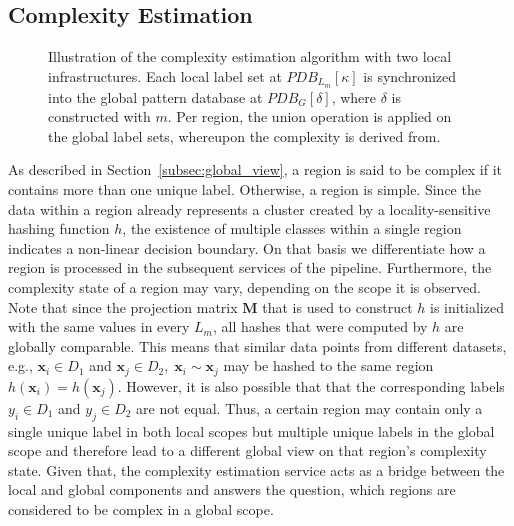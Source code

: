\documentclass[../../main.tex]{subfiles}
\begin{document}
\subsection{Complexity Estimation} \label{sec:complexity_estimation}

\begin{figure}[b!]
   \centering
   
   \caption{Illustration of the complexity estimation algorithm with two local infrastructures. Each local label set at $PDB_{L_m}[\kappa]$ is synchronized into the global pattern database at $PDB_G[\delta]$, where $\delta$ is constructed with $m$. Per region, the union operation is applied on the global label sets, whereupon the complexity is derived from.}  \label{fig:complexity_estimation}
\end{figure}

As described in Section~\ref{subsec:global_view}, a region is said to be complex if it contains more than one unique label. Otherwise, a region is simple. Since the data within a region already represents a cluster created by a locality-sensitive hashing function $h$, the existence of multiple classes within a single region indicates a non-linear decision boundary. On that basis we differentiate how a region is processed in the subsequent services of the pipeline. Furthermore, the complexity state of a region may vary, depending on the scope it is observed. Note that since the projection matrix $\bm{M}$ that is used to construct $h$ is initialized with the same values in every $L_m$, all hashes that were computed by $h$ are globally comparable. This means that similar data points from different datasets, e.g., $\bm{x}_i \in D_1$ and $\bm{x}_j \in D_2, \; \bm{x}_i \sim \bm{x}_j$ may be hashed to the same region $h(\bm{x}_i) = h(\bm{x}_j)$. However, it is also possible that that the corresponding labels $y_i \in D_1$ and $y_j \in D_2$ are not equal. Thus, a certain region may contain only a single unique label in both local scopes but multiple unique labels in the global scope and therefore lead to a different global view on that region's complexity state. Given that, the complexity estimation service acts as a bridge between the local and global components and answers the question, which regions are considered to be complex in a global scope.
\end{document}
